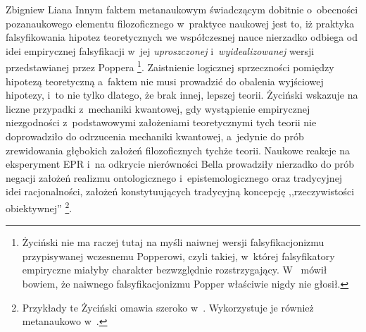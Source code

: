 \begin{artplenv}{Zbigniew Liana}
Innym faktem metanaukowym świadczącym dobitnie o~obecności pozanaukowego elementu filozoficznego w~praktyce naukowej
jest to, iż praktyka falsyfikowania hipotez teoretycznych we współczesnej nauce nierzadko odbiega od idei empirycznej
falsyfikacji w~jej \textit{uproszczonej} i~\textit{wyidealizowanej} wersji przedstawianej przez Poppera
\parencite[zob.][s.~230]{zycinski_elementy_1996}\footnote{Życiński nie ma raczej tutaj na myśli naiwnej wersji
falsyfikacjonizmu przypisywanej wczesnemu Popperowi, czyli takiej, w~której falsyfikatory empiryczne miałyby charakter
bezwzględnie rozstrzygający. W~\parencite[s.~121]{zycinski_jezyk_1983}
mówił
bowiem, że naiwnego falsyfikacjonizmu Popper właściwie nigdy nie głosił.}. Zaistnienie logicznej sprzeczności pomiędzy
hipotezą teoretyczną a~faktem nie musi prowadzić do obalenia wyjściowej hipotezy, i~to nie tylko dlatego, że brak
innej, lepszej teorii. Życiński wskazuje na liczne przypadki z~mechaniki kwantowej, gdy wystąpienie empirycznej
niezgodności z~podstawowymi założeniami teoretycznymi tych teorii nie doprowadziło do odrzucenia mechaniki kwantowej, a~jedynie
do prób zrewidowania głębokich założeń filozoficznych tychże teorii. Naukowe reakcje na eksperyment EPR i~na
odkrycie nierówności Bella prowadziły nierzadko do prób negacji założeń realizmu ontologicznego i~epistemologicznego
oraz tradycyjnej idei racjonalności, założeń konstytuujących tradycyjną koncepcję ,,rzeczywistości obiektywnej''
\parencite[s.~230]{zycinski_elementy_1996}\footnote{Przykłady te Życiński omawia szeroko
w~\parencite*[s.~175–180]{zycinski_teizm_1985}.
Wykorzystuje je również metanaukowo
w~\parencites[s.~129n.137]{zycinski_structure_1988}[s.~228nn.243]{zycinski_struktura_2013}[s.~230]{zycinski_elementy_1996}.
}.


\end{artplenv}
